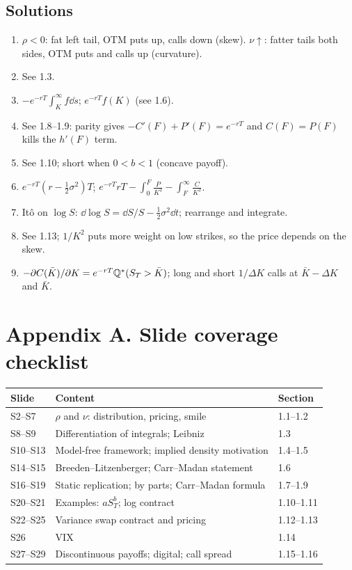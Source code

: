 \documentclass[10pt]{article}
\begin{document}
\subsection*{Solutions}
\begin{enumerate}[label=S\arabic*.]
\item $\rho<0$: fat left tail, OTM puts up, calls down (skew). $\nu\uparrow$: fatter tails both sides, OTM puts and calls up (curvature).
\item See 1.3.
\item $-e^{-rT}\int_K^\infty f\dd s$; $e^{-rT}f(K)$ (see 1.6).
\item See 1.8--1.9: parity gives $-C'(F)+P'(F)=e^{-rT}$ and $C(F)=P(F)$ kills the $h'(F)$ term.
\item See 1.10; short when $0<b<1$ (concave payoff).
\item $e^{-rT}(r-\frac12\sigma^2)T$; $e^{-rT}rT-\int_0^F\frac{P}{K^2}-\int_F^\infty\frac{C}{K^2}$.
\item It\^o on $\log S$: $\dd\log S=\dd S/S-\frac12\sigma^2\dd t$; rearrange and integrate.
\item See 1.13; $1/K^2$ puts more weight on low strikes, so the price depends on the skew.
\item $-\partial C(\bar K)/\partial K=e^{-rT}\mathbb{Q}^*(S_T>\bar K)$; long and short $1/\Delta K$ calls at $\bar K-\Delta K$ and $\bar K$.
\end{enumerate}

\section*{Appendix A. Slide coverage checklist}
{\small\begin{tabularx}{\linewidth}{@{}l X l@{}}\toprule
Slide & Content & Section\\\midrule
S2--S7 & $\rho$ and $\nu$: distribution, pricing, smile & 1.1--1.2\\
S8--S9 & Differentiation of integrals; Leibniz & 1.3\\
S10--S13 & Model-free framework; implied density motivation & 1.4--1.5\\
S14--S15 & Breeden--Litzenberger; Carr--Madan statement & 1.6\\
S16--S19 & Static replication; by parts; Carr--Madan formula & 1.7--1.9\\
S20--S21 & Examples: $aS_T^b$; log contract & 1.10--1.11\\
S22--S25 & Variance swap contract and pricing & 1.12--1.13\\
S26 & VIX & 1.14\\
S27--S29 & Discontinuous payoffs; digital; call spread & 1.15--1.16\\\bottomrule
\end{tabularx}}
\end{document}

